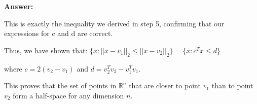 \documentclass{article}
\newenvironment{answer}
    {\par\noindent\textbf{Answer:}\par}
    {\par}
\begin{document}
\begin{enumerate}
\begin{answer}
\begin{enumerate}
        This is exactly the inequality we derived in step 5, confirming that our expressions for c and d are correct.

        Thus, we have shown that:
        $\{x : ||x - v_1||_2 \leq ||x - v_2||_2\} = \{x : c^T x \leq d\}$

where $c = 2(v_2 - v_1)$ and $d = v_2^Tv_2 - v_1^Tv_1$.

        This proves that the set of points in $\mathbb{R}^n$ that are closer to point $v_1$ than to point $v_2$ form a half-space for any dimension $n$.
    \end{enumerate}
    \end{answer}
\end{enumerate}
\end{document}
